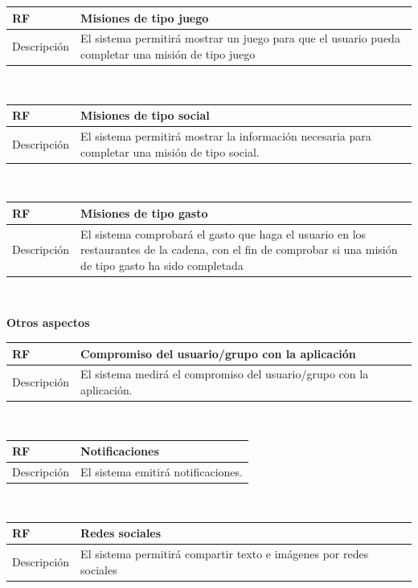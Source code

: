 \documentclass[twoside]{report}
\newcommand\addrow[2]{#1 &#2\\ }
\newcommand\addheading[2]{#1 &#2\\ \hline}
\newcommand\tabularhead{\begin{tabular}{lp{0.7\textwidth}}
\hline
}
\newenvironment{req}{\tabularhead}
{\hline\end{tabular}}
\begin{document}
\begin{req}
	\addheading{\textbf{RF\arabic{functionalRequirements}}}{Misiones de tipo juego}
	\addrow{Descripción}{El sistema permitirá mostrar un juego para que el usuario pueda completar una misión de tipo juego}
\end{req}\\

\begin{req}
	\addheading{\textbf{RF\arabic{functionalRequirements}}}{Misiones de tipo social}
	\addrow{Descripción}{El sistema permitirá mostrar la información necesaria para completar una misión de tipo social.}
\end{req}\\

\begin{req}
	\addheading{\textbf{RF\arabic{functionalRequirements}}}{Misiones de tipo gasto}
	\addrow{Descripción}{El sistema comprobará el gasto que haga el usuario en los restaurantes de la cadena, con el fin de comprobar si una misión de tipo gasto ha sido completada}
\end{req}\\

\textbf{Otros aspectos}\\

\begin{req}
	\label{rfcompromiso}
	\addheading{\textbf{RF\arabic{functionalRequirements}}}{Compromiso del usuario/grupo con la aplicación}
	\addrow{Descripción}{El sistema medirá el compromiso del usuario/grupo con la aplicación.}
\end{req}\\

\begin{req}
	\addheading{\textbf{RF\arabic{functionalRequirements}}}{Notificaciones}
	\addrow{Descripción}{El sistema emitirá notificaciones.}
\end{req}\\

\begin{req}
	\addheading{\textbf{RF\arabic{functionalRequirements}}}{Redes sociales}
	\addrow{Descripción}{El sistema permitirá compartir texto e imágenes por redes sociales}
\end{req}\\
\end{document}
